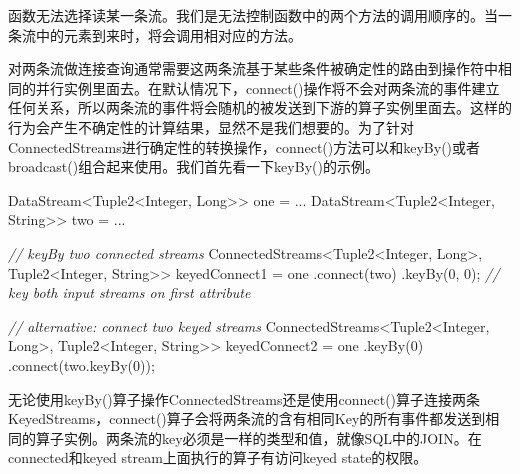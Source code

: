 \documentclass[cn,11pt,chinese]{elegantbook}
\newenvironment{Shaded}{}{}
\newcommand{\BuiltInTok}[1]{#1}
\newcommand{\CommentTok}[1]{\textcolor[rgb]{0.38,0.63,0.69}{\textit{#1}}}
\newcommand{\DecValTok}[1]{\textcolor[rgb]{0.25,0.63,0.44}{#1}}
\newcommand{\FunctionTok}[1]{\textcolor[rgb]{0.02,0.16,0.49}{#1}}
\newcommand{\NormalTok}[1]{#1}
\renewenvironment{quote}{\begin{customblockquote}\list{}{\rightmargin=0em\leftmargin=0em}%
\item\relax\color{blockquote-text}\ignorespaces}{\unskip\unskip\endlist\end{customblockquote}}
\begin{document}
\begin{quote}
函数无法选择读某一条流。我们是无法控制函数中的两个方法的调用顺序的。当一条流中的元素到来时，将会调用相对应的方法。
\end{quote}

对两条流做连接查询通常需要这两条流基于某些条件被确定性的路由到操作符中相同的并行实例里面去。在默认情况下，connect()操作将不会对两条流的事件建立任何关系，所以两条流的事件将会随机的被发送到下游的算子实例里面去。这样的行为会产生不确定性的计算结果，显然不是我们想要的。为了针对ConnectedStreams进行确定性的转换操作，connect()方法可以和keyBy()或者broadcast()组合起来使用。我们首先看一下keyBy()的示例。

\begin{Shaded}
\begin{Highlighting}[]
\NormalTok{DataStream\textless{}Tuple2\textless{}}\BuiltInTok{Integer}\NormalTok{, }\BuiltInTok{Long}\NormalTok{\textgreater{}\textgreater{} one = ...}
\NormalTok{DataStream\textless{}Tuple2\textless{}}\BuiltInTok{Integer}\NormalTok{, }\BuiltInTok{String}\NormalTok{\textgreater{}\textgreater{} two = ...}

\CommentTok{// keyBy two connected streams}
\NormalTok{ConnectedStreams\textless{}Tuple2\textless{}}\BuiltInTok{Integer}\NormalTok{, }\BuiltInTok{Long}\NormalTok{\textgreater{}, Tuple2\textless{}}\BuiltInTok{Integer}\NormalTok{, }\BuiltInTok{String}\NormalTok{\textgreater{}\textgreater{} keyedConnect1 = one}
\NormalTok{  .}\FunctionTok{connect}\NormalTok{(two)}
\NormalTok{  .}\FunctionTok{keyBy}\NormalTok{(}\DecValTok{0}\NormalTok{, }\DecValTok{0}\NormalTok{); }\CommentTok{// key both input streams on first attribute}

\CommentTok{// alternative: connect two keyed streams}
\NormalTok{ConnectedStreams\textless{}Tuple2\textless{}}\BuiltInTok{Integer}\NormalTok{, }\BuiltInTok{Long}\NormalTok{\textgreater{}, Tuple2\textless{}}\BuiltInTok{Integer}\NormalTok{, }\BuiltInTok{String}\NormalTok{\textgreater{}\textgreater{} keyedConnect2 = one}
\NormalTok{  .}\FunctionTok{keyBy}\NormalTok{(}\DecValTok{0}\NormalTok{)}
\NormalTok{  .}\FunctionTok{connect}\NormalTok{(two.}\FunctionTok{keyBy}\NormalTok{(}\DecValTok{0}\NormalTok{));}
\end{Highlighting}
\end{Shaded}

无论使用keyBy()算子操作ConnectedStreams还是使用connect()算子连接两条KeyedStreams，connect()算子会将两条流的含有相同Key的所有事件都发送到相同的算子实例。两条流的key必须是一样的类型和值，就像SQL中的JOIN。在connected和keyed
stream上面执行的算子有访问keyed state的权限。
\end{document}
